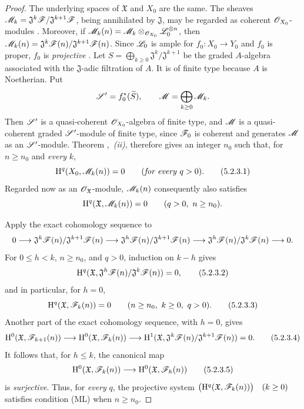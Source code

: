 \begin{proof}
The underlying spaces of $\mathfrak{X}$ and $X_0$ are the same.
The sheaves $\mathscr{M}_k
=
\mathfrak{J}^k\mathscr{F}/\mathfrak{J}^{k+1}\mathscr{F}$,
being annihilated by $\mathfrak{J}$, may be regarded as coherent
$\mathscr{O}_{X_0}$-modules .  Moreover, if $\mathscr{M}_k(n)
=
\mathscr{M}_k\otimes_{\mathscr{O}_{X_0}}\mathscr{L}_0^{\otimes n}$,
then $\mathscr{M}_k(n)
=
\mathfrak{J}^k\mathscr{F}(n)/
\mathfrak{J}^{k+1}\mathscr{F}(n)$.
Since $\mathscr{L}_0$ is ample for $f_0:X_0\to Y_0$ and $f_0$ is
proper,
$f_0$ is \emph{projective} .  Let $S=\bigoplus_{k\geq0}
\mathfrak{J}^k/\mathfrak{J}^{k+1}$
be the graded $A$-algebra associated with the
$\mathfrak{J}$-adic filtration of $A$.  It is of finite type
because $A$ is Noetherian.  Put
\[
  \mathscr{S}'=f_0^*(\widetilde{S}),\qquad
  \mathscr{M}=\bigoplus_{k\geq0}\mathscr{M}_k.
\]
Then $\mathscr{S}'$ is a quasi-coherent $\mathscr{O}_{X_0}$-algebra of
finite type, and $\mathscr{M}$ is a quasi-coherent graded
$\mathscr{S}'$-module of finite type, since $\mathscr{F}_0$ is coherent and
generates $\mathscr{M}$ as an $\mathscr{S}'$-module.  Theorem
,~\emph{(ii)}, therefore gives an integer $n_0$
such that, for $n\geq n_0$ and \emph{every} $k$,
\[
  \mathrm{H}^q(X_0,\mathscr{M}_k(n))=0
  \qquad(\text{\emph{for every} }q>0).
  \tag{5.2.3.1}
  \label{III.5.2.3.1}
\]
Regarded now as an $\mathscr{O}_{\mathfrak{X}}$-module,
$\mathscr{M}_k(n)$ consequently also satisfies
\[
  \mathrm{H}^q(\mathfrak{X},\mathscr{M}_k(n))=0
  \qquad(q>0,\ n\geq n_0).
\]

Apply the exact cohomology sequence to
\[
  0\longrightarrow
  \mathfrak{J}^k\mathscr{F}(n)/\mathfrak{J}^{k+1}\mathscr{F}(n)
  \longrightarrow
  \mathfrak{J}^h\mathscr{F}(n)/\mathfrak{J}^{k+1}\mathscr{F}(n)
  \longrightarrow
  \mathfrak{J}^h\mathscr{F}(n)/\mathfrak{J}^{k}\mathscr{F}(n)
  \longrightarrow0.
\]
For $0\leq h<k$, $n\geq n_0$, and $q>0$, induction on $k-h$
gives
\[
  \mathrm{H}^q(\mathfrak{X},
    \mathfrak{J}^h\mathscr{F}(n)/\mathfrak{J}^{k}\mathscr{F}(n))=0,
  \tag{5.2.3.2}
  \label{III.5.2.3.2}
\]
and in particular, for $h=0$,
\[
  \mathrm{H}^q(\mathfrak{X},\mathscr{F}_k(n))=0
  \qquad(n\geq n_0,\ k\geq0,\ q>0).
  \tag{5.2.3.3}
  \label{III.5.2.3.3}
\]
Another part of the exact cohomology sequence, with $h=0$, gives
\[
  \mathrm{H}^0(\mathfrak{X},\mathscr{F}_{k+1}(n))
  \longrightarrow
  \mathrm{H}^0(\mathfrak{X},\mathscr{F}_k(n))
  \longrightarrow
  \mathrm{H}^1(\mathfrak{X},
    \mathfrak{J}^k\mathscr{F}(n)/\mathfrak{J}^{k+1}\mathscr{F}(n))
  =0.
  \tag{5.2.3.4}
  \label{III.5.2.3.4}
\]
It follows that, for $h\leq k$, the canonical map
\[
  \mathrm{H}^0(\mathfrak{X},\mathscr{F}_k(n))
  \longrightarrow
  \mathrm{H}^0(\mathfrak{X},\mathscr{F}_h(n))
  \tag{5.2.3.5}
  \label{III.5.2.3.5}
\]
is \emph{surjective}.  Thus, for \emph{every} $q$, the projective system $\bigl(\mathrm{H}^q(\mathfrak{X},\mathscr{F}_k(n))\bigr)\quad(k\geq0)$
satisfies condition (ML) when $n\geq n_0$.


\end{proof}
